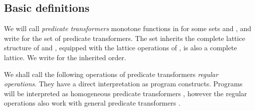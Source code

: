 \documentclass[]{llncs}
\begin{document}
\subsection{Basic definitions}
\par
We will call \emph{predicate transformers} monotone functions in  for some sets  and , and write  for the set of predicate transformers. The set  inherits the complete lattice structure of  and , equipped with the lattice operations of , is also a complete lattice. We write  for the inherited order.
\par
We shall call the following operations of predicate transformers \emph{regular operations}. They have a direct interpretation as program constructs. Programs will be interpreted as homogeneous predicate transformers , however the regular operations also work with general predicate transformers .
\end{document}
